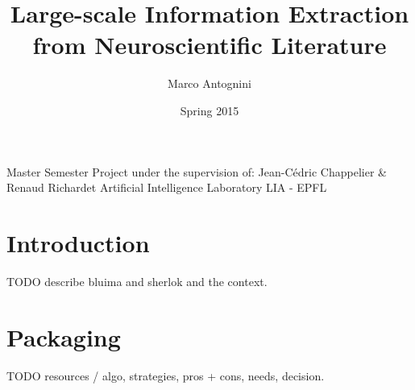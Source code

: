 \documentclass{article}
\title{Large-scale Information Extraction from Neuroscientific Literature}
\date{Spring 2015}
\author{Marco Antognini}
\begin{document}
\maketitle

Master Semester Project under the supervision of:
Jean-Cédric Chappelier \& 
Renaud Richardet
Artificial Intelligence Laboratory LIA - EPFL

\newpage
{}


\tableofcontents
\newpage


\section{Introduction}

TODO describe bluima and sherlok and the context.


\section{Packaging}

TODO resources / algo, strategies, pros + cons, needs, decision.


\end{document}
